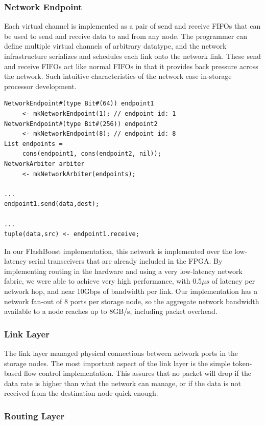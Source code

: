 \subsubsection{Network Endpoint}

Each virtual channel is implemented as a pair of send and receive FIFOs that can
be used to send and receive data to and from any node. The programmer can define
multiple virtual channels of arbitrary datatype, and the network infrastructure
serializes and schedules each link onto the network link. These send and receive
FIFOs act like normal FIFOs in that it provides back pressure across the
network. Such intuitive characteristics of the network ease in-storage processor
development.

\begin{verbatim}
NetworkEndpoint#(type Bit#(64)) endpoint1 
     <- mkNetworkEndpoint(1); // endpoint id: 1
NetworkEndpoint#(type Bit#(256)) endpoint2 
     <- mkNetworkEndpoint(8); // endpoint id: 8
List endpoints = 
     cons(endpoint1, cons(endpoint2, nil));
NetworkArbiter arbiter 
     <- mkNetworkArbiter(endpoints);

...
endpoint1.send(data,dest);

...
tuple(data,src) <- endpoint1.receive;
\end{verbatim}

In our FlashBoost implementation, this network is implemented over the
low-latency serial transceivers that are already included in the FPGA. By
implementing routing in the hardware and using a very low-latency network
fabric, we were able to achieve very high performance, with 0.5$\mu s$ of
latency per network hop, and near 10Gbps of bandwidth per link. Our
implementation has a network fan-out of 8 ports per storage node, so the
aggregate network bandwidth available to a node reaches up to 8GB/s, including
packet overhead.

\subsubsection{Link Layer}

The link layer managed physical connections between network ports in the storage
nodes. The most important aspect of the link layer is the simple token-based
flow control implementation. This assures that no packet will drop if the data
rate is higher than what the network can manage, or if the data is not received
from the destination node quick enough.

\subsubsection{Routing Layer}

